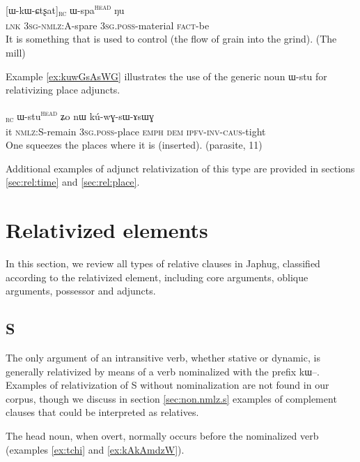 \documentclass[oldfontcommands,oneside,a4paper,11pt]{article}
\newcommand{\ipa}[1]{{\phon #1}} %
\newcommand{\topic}{\textsc{dem}}
\newcommand{\tete}{\textsuperscript{\textsc{head}}}
\newcommand{\rc}{\textsubscript{\textsc{rc}}}
\begin{document}
     \begin{exe}
   \ex \label{ex:wkwctsxat}
 \gll \ipa{tɕe}   	[\ipa{ɯ-kɯ-ɕtʂat}]\rc{}   	\ipa{ɯ-spa}\tete{}   	\ipa{ŋu}        \\
\textsc{lnk} \textsc{3sg-nmlz:A}-spare  \textsc{3sg.poss}-material \textsc{fact}-be\\
\glt  It is something that is used to control (the flow of grain into the grind). (The mill)
\end{exe}



Example \ref{ex:kuwGsAsWG} illustrates the use of the generic noun \ipa{ɯ-stu} for relativizing place adjuncts.

\begin{exe}
\ex \label{ex:kuwGsAsWG}
\gll
[\ipa{ɯʑo}  	\ipa{kɯ-rɤʑi}]\rc{}  	\ipa{ɯ-stu}\tete{} \ipa{ʑo} 	\ipa{nɯ}  	\ipa{kú-wɣ-sɯ-ɤsɯɣ}  \\
it \textsc{nmlz:S}-remain \textsc{3sg.poss}-place \textsc{emph} \topic{}  \textsc{ipfv-inv-caus}-tight \\
\glt One squeezes the places where it is (inserted). (parasite, 11)
  \end{exe}

Additional examples of adjunct relativization of this type are provided in sections \ref{sec:rel:time} and \ref{sec:rel:place}.

\section{Relativized elements} 

In this section, we review all types of relative clauses in Japhug, classified according to the relativized element, including core arguments, oblique arguments, possessor and adjuncts.

\subsection{S} \label{sec:s.rel}
The only argument of an intransitive verb, whether stative or dynamic, is generally relativized by means of a verb nominalized with the prefix \ipa{kɯ}--. Examples of relativization of S without nominalization are   not found in our corpus, though we discuss in section \ref{sec:non.nmlz.s} examples of complement clauses that could be interpreted as relatives.

The head noun, when overt, normally occurs   before the nominalized verb (examples \ref{ex:tchi} and \ref{ex:kAkAmdzW}). 
\end{document}
